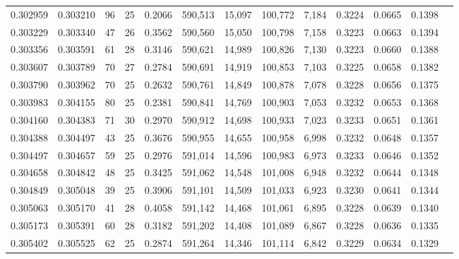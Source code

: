 \begin{tabular}{rrrrrrrrrrrrr}
0.302959 & 0.303210 &  96 &  25 &                                     0.2066 & 590,513 &  15,097 & 100,772 &   7,184 & 0.3224 & 0.0665 & 0.1398 \\
0.303229 & 0.303340 &  47 &  26 &                                     0.3562 & 590,560 &  15,050 & 100,798 &   7,158 & 0.3223 & 0.0663 & 0.1394 \\
0.303356 & 0.303591 &  61 &  28 &                                     0.3146 & 590,621 &  14,989 & 100,826 &   7,130 & 0.3223 & 0.0660 & 0.1388 \\
0.303607 & 0.303789 &  70 &  27 &                                     0.2784 & 590,691 &  14,919 & 100,853 &   7,103 & 0.3225 & 0.0658 & 0.1382 \\
0.303790 & 0.303962 &  70 &  25 &                                     0.2632 & 590,761 &  14,849 & 100,878 &   7,078 & 0.3228 & 0.0656 & 0.1375 \\
0.303983 & 0.304155 &  80 &  25 &                                     0.2381 & 590,841 &  14,769 & 100,903 &   7,053 & 0.3232 & 0.0653 & 0.1368 \\
0.304160 & 0.304383 &  71 &  30 &                                     0.2970 & 590,912 &  14,698 & 100,933 &   7,023 & 0.3233 & 0.0651 & 0.1361 \\
0.304388 & 0.304497 &  43 &  25 &                                     0.3676 & 590,955 &  14,655 & 100,958 &   6,998 & 0.3232 & 0.0648 & 0.1357 \\
0.304497 & 0.304657 &  59 &  25 &                                     0.2976 & 591,014 &  14,596 & 100,983 &   6,973 & 0.3233 & 0.0646 & 0.1352 \\
0.304658 & 0.304842 &  48 &  25 &                                     0.3425 & 591,062 &  14,548 & 101,008 &   6,948 & 0.3232 & 0.0644 & 0.1348 \\
0.304849 & 0.305048 &  39 &  25 &                                     0.3906 & 591,101 &  14,509 & 101,033 &   6,923 & 0.3230 & 0.0641 & 0.1344 \\
0.305063 & 0.305170 &  41 &  28 &                                     0.4058 & 591,142 &  14,468 & 101,061 &   6,895 & 0.3228 & 0.0639 & 0.1340 \\
0.305173 & 0.305391 &  60 &  28 &                                     0.3182 & 591,202 &  14,408 & 101,089 &   6,867 & 0.3228 & 0.0636 & 0.1335 \\
0.305402 & 0.305525 &  62 &  25 &                                     0.2874 & 591,264 &  14,346 & 101,114 &   6,842 & 0.3229 & 0.0634 & 0.1329 \\

\end{tabular}
